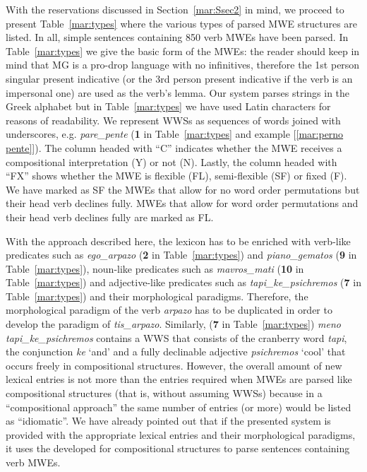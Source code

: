 \documentclass[output=paper]{langsci/langscibook}
\begin{document}
With the reservations discussed in Section~\ref{mar:Ssec2} in mind, we proceed to present Table~\ref{mar:types} where the various types of parsed MWE structures are listed. In all, simple sentences containing 850 verb MWEs have been parsed. In Table~\ref{mar:types} we give the basic form of the MWEs: the reader should keep in mind that MG is a pro-drop language with no infinitives, therefore the 1st person singular present indicative (or the 3rd person present indicative if the verb is an impersonal one) are used as the verb's lemma. Our system parses strings in the Greek alphabet but in Table~\ref{mar:types} we have used Latin characters for reasons of readability. We represent WWSs as sequences of words joined with underscores, e.g. \emph{pare\_pente} (\textbf{1} in Table~\ref{mar:types} and example [\ref{mar:perno pente}]). The column headed with ``C'' indicates whether the MWE receives a compositional interpretation (Y) or not (N). Lastly, the column headed with ``FX'' shows whether the MWE is flexible (FL), semi-flexible (SF) or fixed (F). We have marked as SF the MWEs that allow for no word order permutations but their head verb declines fully. MWEs that allow for word order permutations and their head verb declines fully are marked as FL.

With the approach described here, the lexicon has to be enriched with verb-like predicates such as \emph{ego\_arpazo} (\textbf{2} in Table~\ref{mar:types}) and \emph{piano\_gematos} (\textbf{9} in Table~\ref{mar:types}), noun-like predicates such as \emph{mavros\_mati} (\textbf{10} in Table~\ref{mar:types}) and adjective-like predicates such as \emph{tapi\_ke\_psichremos} (\textbf{7} in Table~\ref{mar:types}) and their morphological para\-digms. Therefore, the morphological paradigm of the verb \textit{arpazo} has to be duplicated in order to develop the paradigm of \emph{tis\_arpazo}. Similarly,  (\textbf{7} in Table~\ref{mar:types}) \emph{meno tapi\_ke\_psichremos} contains a WWS that consists of the cranberry word \textit{tapi}, the conjunction \textit{ke} `and' and a fully declinable adjective \textit{psichremos} `cool' that occurs freely in compositional structures. However, the overall amount of new lexical entries is not more than the entries required when MWEs are parsed like compositional structures (that is, without assuming WWSs) because in a ``compositional approach'' the same number of entries (or more) would be listed as ``idiomatic''. We have already pointed out that if the presented system is provided with the appropriate lexical entries and their morphological paradigms, it uses the  developed for compositional structures to parse sentences containing verb MWEs. 
\end{document}
